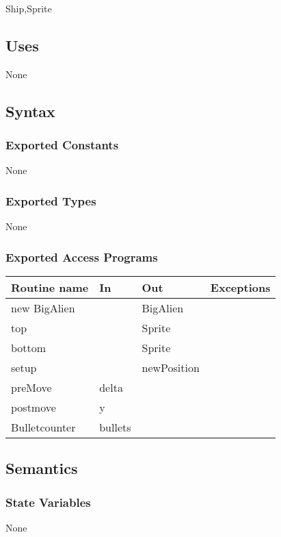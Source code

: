 \documentclass[12pt]{article}
\begin{document}
Ship,Sprite

\subsection* {Uses}

None

\subsection* {Syntax}

\subsubsection* {Exported Constants}

None

\subsubsection* {Exported Types}

None 

\subsubsection* {Exported Access Programs}

\begin{tabular}{| l | l | l | p{5cm} |}
\hline
\textbf{Routine name} & \textbf{In} & \textbf{Out} & \textbf{Exceptions}\\
\hline
new BigAlien & ~ & BigAlien  & ~\\
\hline
top & ~ & Sprite & ~\\
\hline
bottom & ~ & Sprite  & ~\\
\hline
setup & ~ & newPosition & ~ \\
\hline
preMove & delta & ~ & ~\\
\hline
postmove & y & ~ & ~\\
\hline
Bulletcounter & bullets & ~ & ~\\
\end{tabular}

\subsection* {Semantics}

\subsubsection* {State Variables}
None
\end{document}
